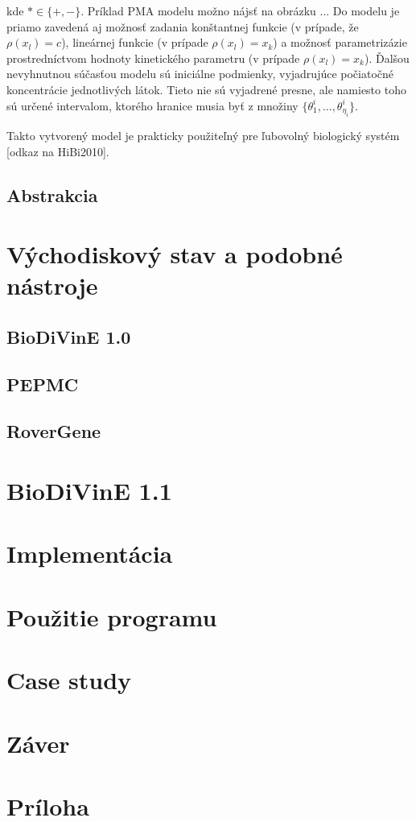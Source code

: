 \documentclass[11pt,final,oneside]{fithesis}
\begin{document}
kde $* \in \{+,-\}$. Pr\'iklad PMA modelu mo\v zno n\'ajs\v t na obr\'azku ... Do modelu je priamo zaveden\'a aj mo\v znos\v t zadania kon\v stantnej funkcie 
(v pr\'ipade, \v ze $\rho(x_l) = c$), line\'arnej funkcie (v pr\'ipade $\rho(x_l) = x_k$) a mo\v znos\v t parametriz\'azie prostredn\'ictvom hodnoty 
kinetick\'eho parametru (v pr\'ipade $\rho(x_l) = x_k$). \v Dal\v sou nevyhnutnou s\'u\v cas\v tou modelu s\'u inici\'alne podmienky, vyjadruj\'uce 
po\v ciato\v cn\'e koncentr\'acie jednotliv\'ych l\'atok. Tieto nie s\'u vyjadren\'e presne, ale namiesto toho s\'u ur\v cen\'e intervalom, ktor\'eho
hranice musia by\v t z mno\v ziny $\{ \theta_1^i,\dots{},\theta_{\eta_i}^i \}$.

Takto vytvoren\'y model je prakticky pou\v zite\v ln\'y pre \v lubovoln\'y biologick\'y syst\'em [odkaz na HiBi2010].


\section{Abstrakcia}


\chapter{V\'ychodiskov\'y stav a podobn\' e n\'astroje}

\section{BioDiVinE 1.0}

\section{PEPMC}

\section{RoverGene}


\chapter{BioDiVinE 1.1}


\chapter{Implement\' acia}


\chapter{Pou\v zitie programu}


\chapter{Case study}


\chapter{Z\' aver}


 


\chapter*{Pr\' iloha}
\end{document}
